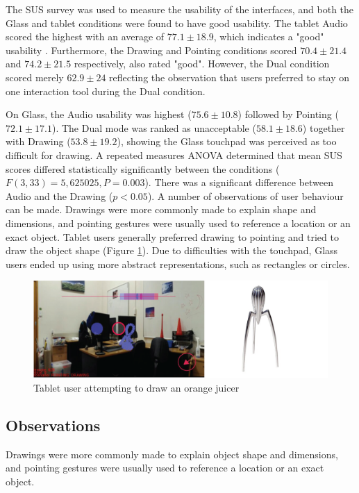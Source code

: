 The SUS survey was used to measure the usability of the interfaces, and both the Glass and tablet conditions were found to have good usability. The tablet Audio scored the highest with an average of $77.1\pm18.9$, which indicates a "good" usability \cite{Bangor2008}. Furthermore, the Drawing and Pointing conditions scored $70.4\pm21.4$ and $74.2\pm21.5$ respectively, also rated "good". However, the Dual condition scored merely $62.9\pm24$ reflecting the observation that users preferred to stay on one interaction tool during the Dual condition.

On Glass, the Audio usability was highest ($75.6\pm10.8$) followed by Pointing ($72.1\pm17.1$). The Dual mode was ranked as unacceptable ($58.1\pm18.6$) together with Drawing ($53.8\pm19.2$), showing the Glass touchpad was perceived as too difficult for drawing. A repeated measures ANOVA determined that mean SUS scores differed statistically significantly between the conditions ($F(3, 33)=5,625025, P=0.003$). There was a significant difference between Audio and the Drawing ($p<0.05$). A number of observations of user behaviour can be made. Drawings were more commonly made to explain shape and dimensions, and pointing gestures were usually used to reference a location or an exact object. Tablet users generally preferred drawing to pointing and tried to draw the object shape (Figure \ref{fig:ismar14:tablet-drawing}). Due to difficulties with the touchpad, Glass users ended up using more abstract representations, such as rectangles or circles.

\begin{figure}[ht]
	\centering
	\includegraphics[width=\linewidth]{images/ismar14/tablet-drawing}
	\caption{Tablet user attempting to draw an orange juicer}
	\label{fig:ismar14:tablet-drawing}
\end{figure}

\subsection{Observations}

Drawings were more commonly made to explain object shape and dimensions, and pointing gestures were usually used to reference a location or an exact object.

